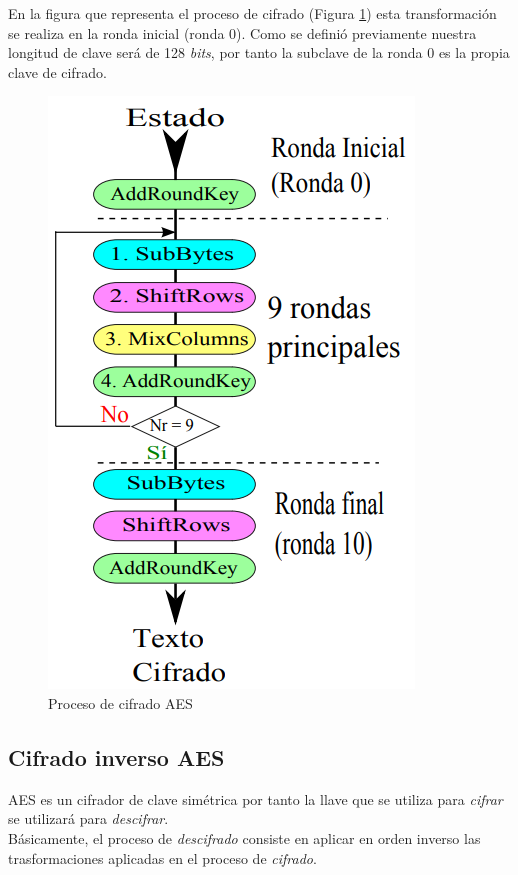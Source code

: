 \documentclass[peerreview]{IEEEtran}
\begin{document}
En la figura que representa el proceso de cifrado (Figura \ref{fig: 7}) esta
transformación se realiza en la ronda inicial (ronda 0). Como se definió
previamente nuestra longitud de clave será de 128 \textit{bits}, por tanto la
subclave de la ronda 0 es la propia clave de cifrado.
\begin{figure}[h]
  \includegraphics[scale=0.5]{figuras/Diagrama1.png}
  \centering
  \caption{Proceso de cifrado AES}
  \label{fig: 7}
\end{figure}

\subsection{Cifrado inverso AES}
AES es un cifrador de clave simétrica por tanto la llave que se utiliza para \textit{cifrar} se utilizará para \textit{descifrar}. \\

Básicamente, el proceso de \textit{descifrado} consiste en aplicar en orden inverso las trasformaciones aplicadas en el proceso de \textit{cifrado}.\\
\end{document}
